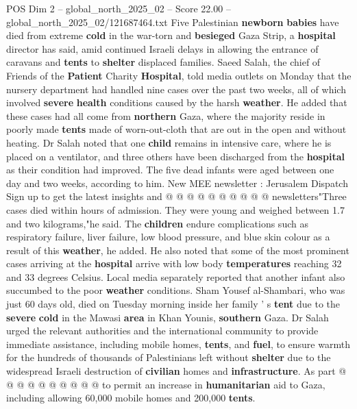 \begin{textsample}{POS Dim 2 – global\_north\_2025\_02 – Score 22.00 – global\_north\_2025\_02/121687464.txt}  \label{ex:f2_pos_436}
Five Palestinian \textbf{newborn} \textbf{babies} have died from extreme \textbf{cold} in the war-torn and \textbf{besieged} Gaza Strip, a \textbf{hospital} director has said, amid continued Israeli delays in allowing the entrance of caravans and \textbf{tents} to \textbf{shelter} displaced families.
Saeed Salah, the chief of Friends of the \textbf{Patient} Charity \textbf{Hospital}, told media outlets on Monday that the nursery department had handled nine cases over the past two weeks, all of which involved \textbf{severe} \textbf{health} conditions caused by the harsh \textbf{weather}.
He added that these cases had all come from \textbf{northern} Gaza, where the majority reside in poorly made \textbf{tents} made of worn-out-cloth that are out in the open and without heating.
Dr Salah noted that one \textbf{child} remains in intensive care, where he is placed on a ventilator, and three others have been discharged from the \textbf{hospital} as their condition had improved.
The five dead infants were aged between one day and two weeks, according to him.
New MEE newsletter : Jerusalem Dispatch Sign up to get the latest insights and @ @ @ @ @ @ @ @ @ @ newsletters"Three cases died within hours of admission.
They were young and weighed between 1.7 and two kilograms,"he said.
The \textbf{children} endure complications such as respiratory failure, liver failure, low blood pressure, and blue skin colour as a result of this \textbf{weather}, he added.
He also noted that some of the most prominent cases arriving at the \textbf{hospital} arrive with low body \textbf{temperatures} reaching 32 and 33 degrees Celsius.
Local media separately reported that another infant also succumbed to the poor \textbf{weather} conditions.
Sham Yousef al-Shambari, who was just 60 days old, died on Tuesday morning inside her family ' s \textbf{tent} due to the \textbf{severe} \textbf{cold} in the Mawasi \textbf{area} in Khan Younis, \textbf{southern} Gaza.
Dr Salah urged the relevant authorities and the international community to provide immediate assistance, including mobile homes, \textbf{tents}, and \textbf{fuel}, to ensure warmth for the hundreds of thousands of Palestinians left without \textbf{shelter} due to the widespread Israeli destruction of \textbf{civilian} homes and \textbf{infrastructure}.
As part @ @ @ @ @ @ @ @ @ @ to permit an increase in \textbf{humanitarian} aid to Gaza, including allowing 60,000 mobile homes and 200,000 \textbf{tents}.

\end{textsample}
